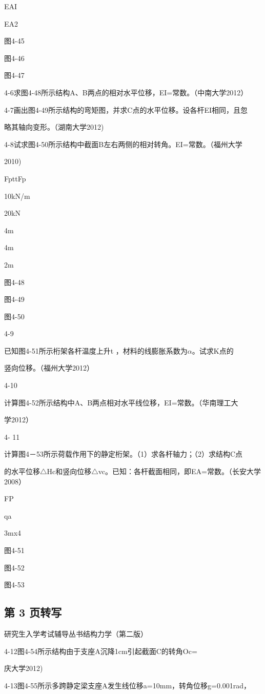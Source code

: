 EAI

EA2

图4-45

图4-46

图4-47

4-6求图4-48所示结构A、B两点的相对水平位移，EI=常数。（中南大学2012）

4-7画出图4-49所示结构的弯矩图，并求C点的水平位移。设各杆EI相同，且忽

略其轴向变形。（湖南大学2012)

4-8试求图4-50所示结构中截面B左右两侧的相对转角。EI=常数。（福州大学

2010)

FpttFp

10kN/m

20kN

4m

4m

2m

图4-48

图4-49

图4-50

4-9

已知图4-51所示桁架各杆温度上升t ，材料的线膨胀系数为$\alpha$。试求K点的

竖向位移。（福州大学2012）

4-10

计算图4-52所示结构中A、B两点相对水平线位移，EI=常数。（华南理工大

学2012）

4- 11

计算图4－53所示荷载作用下的静定桁架。（1）求各杆轴力；（2）求结构C点

的水平位移$\triangle$Hc和竖向位移$\triangle$vc。已知：各杆截面相同，即EA=常数。（长安大学2008）

FP

qa

3mx4

图4-51

图4-52

图4-53

\subsection*{第 3 页转写}
研究生入学考试辅导丛书结构力学（第二版）

4-12图4-54所示结构由于支座A沉降1cm引起截面C的转角Oc=

庆大学2012)

4-13图4-55所示多跨静定梁支座A发生线位移a=10mm，转角位移g=0.001rad，

